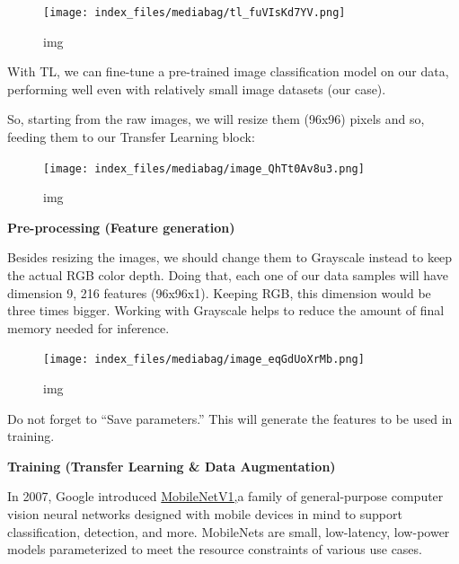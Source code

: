 \documentclass[
  letterpaper,
  DIV=11,
  numbers=noendperiod]{scrreprt}
\begin{document}
\begin{figure}[H]

{\centering \texttt{[image: index\_files/mediabag/tl\_fuVIsKd7YV.png]}

}

\caption{img}

\end{figure}

With TL, we can fine-tune a pre-trained image classification model on
our data, performing well even with relatively small image datasets (our
case).

So, starting from the raw images, we will resize them (96x96) pixels and
so, feeding them to our Transfer Learning block:

\begin{figure}[H]

{\centering \texttt{[image: index\_files/mediabag/image\_QhTt0Av8u3.png]}

}

\caption{img}

\end{figure}

\textbf{Pre-processing (Feature generation)}

Besides resizing the images, we should change them to Grayscale instead
to keep the actual RGB color depth. Doing that, each one of our data
samples will have dimension 9, 216 features (96x96x1). Keeping RGB, this
dimension would be three times bigger. Working with Grayscale helps to
reduce the amount of final memory needed for inference.

\begin{figure}[H]

{\centering \texttt{[image: index\_files/mediabag/image\_eqGdUoXrMb.png]}

}

\caption{img}

\end{figure}

Do not forget to ``Save parameters.'' This will generate the features to
be used in training.

\textbf{Training (Transfer Learning \& Data Augmentation)}

In 2007, Google introduced
\href{https://research.googleblog.com/2017/06/mobilenets-open-source-models-for.html}{MobileNetV1,}a
family of general-purpose computer vision neural networks designed with
mobile devices in mind to support classification, detection, and more.
MobileNets are small, low-latency, low-power models parameterized to
meet the resource constraints of various use cases.
\end{document}
